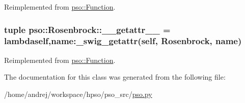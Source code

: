 Reimplemented from \hyperlink{classpso_1_1Function_5bddc07dbaab0ee579488bdcc8103a71}{pso::Function}.\hypertarget{classpso_1_1Rosenbrock_c987569b39c7919e9c720d040904a4c4}{
\subsubsection{\setlength{\rightskip}{0pt plus 5cm}tuple {\bf pso::Rosenbrock::\_\-\_\-getattr\_\-\_\-} = lambdaself,name:\_\-swig\_\-getattr(self, {\bf Rosenbrock}, name)}}
\label{classpso_1_1Rosenbrock_c987569b39c7919e9c720d040904a4c4}




Reimplemented from \hyperlink{classpso_1_1Function_affeed856b337656e88895fa35321496}{pso::Function}.

The documentation for this class was generated from the following file:\begin{CompactItemize}
\item 
/home/andrej/workspace/hpso/pso\_\-src/\hyperlink{pso_8py}{pso.py}\end{CompactItemize}
